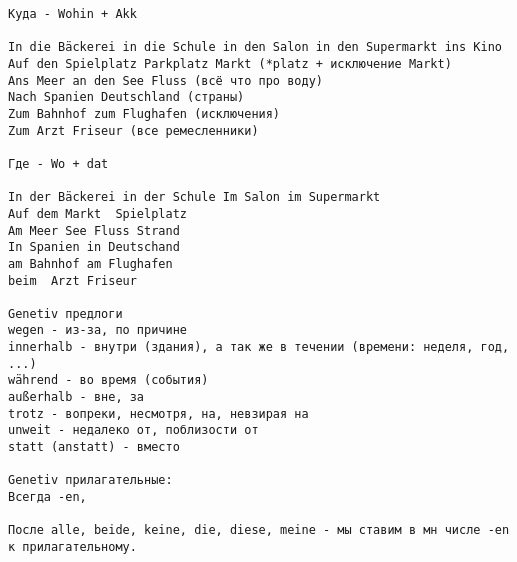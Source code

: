 \documentclass[12pt,a4paper]{report}
\begin{document}
\begin{verbatim}
Куда - Wohin + Akk

In die Bäckerei in die Schule in den Salon in den Supermarkt ins Kino 
Auf den Spielplatz Parkplatz Markt (*platz + исключение Markt)
Ans Meer an den See Fluss (всё что про воду)
Nach Spanien Deutschland (страны)
Zum Bahnhof zum Flughafen (исключения)
Zum Arzt Friseur (все ремесленники)

Где - Wo + dat

In der Bäckerei in der Schule Im Salon im Supermarkt 
Auf dem Markt  Spielplatz
Am Meer See Fluss Strand
In Spanien in Deutschand
am Bahnhof am Flughafen
beim  Arzt Friseur

Genetiv предлоги
wegen - из-за, по причине
innerhalb - внутри (здания), а так же в течении (времени: неделя, год, ...)
während - во время (события)
außerhalb - вне, за
trotz - вопреки, несмотря, на, невзирая на
unweit - недалеко от, поблизости от
statt (anstatt) - вместо

Genetiv прилагательные:
Всегда -en,

После alle, beide, keine, die, diese, meine - мы ставим в мн числе -en к прилагательному.
\end{verbatim}
\end{document}
